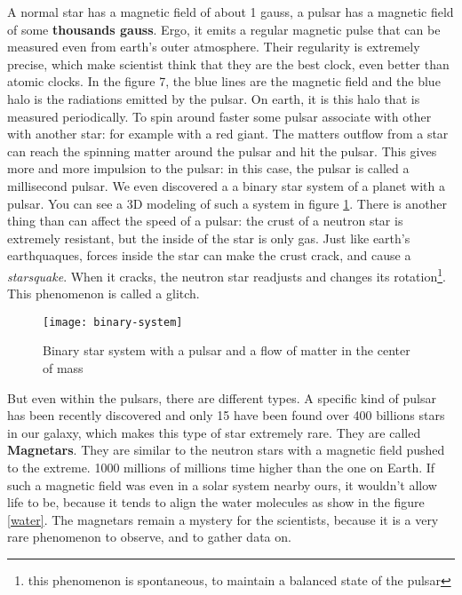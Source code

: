 \documentclass[a4paper, 11pt]{article} %
\begin{document}
A normal star has a magnetic field of about 1 gauss, a pulsar has a magnetic field of some \textbf{thousands gauss}. Ergo, it emits a regular magnetic pulse that can be measured even from earth's outer atmosphere. Their regularity is extremely precise, which make scientist think that they are the best clock, even better than atomic clocks. In the figure 7, the blue lines are the magnetic field and the blue halo is the radiations emitted by the pulsar. On earth, it is this halo that is measured periodically. To spin around faster some pulsar associate with other with another star: for example with a red giant. The matters outflow from a star can reach the spinning matter around the pulsar and hit the pulsar. This gives more and more impulsion to the pulsar: in this case, the pulsar is called a millisecond pulsar. We even discovered a a binary star system of a planet with a pulsar. You can see a 3D modeling of such a system in figure \ref{bin}. There is another thing than can affect the speed of a pulsar: the crust of a neutron star is extremely resistant, but the inside of the star is only gas. Just like earth's earthquaques, forces inside the star can make the crust crack, and cause a \textit{starsquake}. When it cracks, the neutron star readjusts and changes its rotation\footnote{this phenomenon is spontaneous, to maintain a balanced state of the pulsar}. This phenomenon is called a glitch. 




                          
\begin{figure}[h]
\centering
\texttt{[image: binary-system]}
\caption{Binary star system with a pulsar and a flow of matter in the center of mass}
\label{bin}
\end{figure}
\newpage
                            
But even within the pulsars, there are different types. A specific kind of pulsar has been recently discovered and only 15 have been found over 400 billions stars in our galaxy, which makes this type of star extremely rare. They are called \textbf{Magnetars}. They are similar to the neutron stars with a magnetic field pushed to the extreme. 1000 millions of millions time higher than the one on Earth. If such a magnetic field was even in a solar system nearby ours, it wouldn't allow life to be, because it tends to align the water molecules as show in the figure \ref{water}. The magnetars remain a mystery for the scientists, because it is a very rare phenomenon to observe, and to gather data on.
\end{document}
